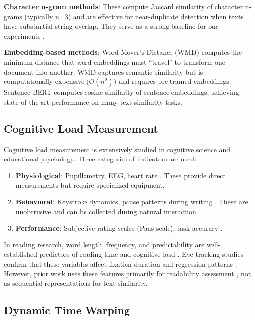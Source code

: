 \documentclass[11pt,letterpaper]{article}
\begin{document}
\textbf{Character n-gram methods}: These compute Jaccard similarity of character n-grams (typically n=3) and are effective for near-duplicate detection when texts have substantial string overlap. They serve as a strong baseline for our experiments \cite{Ukkonen1992}.

\textbf{Embedding-based methods}: Word Mover's Distance (WMD) \cite{Kusner2015} computes the minimum distance that word embeddings must ``travel'' to transform one document into another. WMD captures semantic similarity but is computationally expensive ($O(n^2)$) and requires pre-trained embeddings. Sentence-BERT \cite{Reimers2019} computes cosine similarity of sentence embeddings, achieving state-of-the-art performance on many text similarity tasks.

\subsection{Cognitive Load Measurement}

Cognitive load measurement is extensively studied in cognitive science and educational psychology. Three categories of indicators are used:

\begin{enumerate}
\item \textbf{Physiological}: Pupillometry, EEG, heart rate \cite{Wei2025}. These provide direct measurements but require specialized equipment.

\item \textbf{Behavioral}: Keystroke dynamics, pause patterns during writing \cite{Zhang2021}. These are unobtrusive and can be collected during natural interaction.

\item \textbf{Performance}: Subjective rating scales (Paas scale), task accuracy \cite{Ouwehand2021}.
\end{enumerate}

In reading research, word length, frequency, and predictability are well-established predictors of reading time and cognitive load \cite{Kuperman2013}. Eye-tracking studies confirm that these variables affect fixation duration and regression patterns \cite{Demberg2008}. However, prior work uses these features primarily for readability assessment \cite{Vajjala2012}, not as sequential representations for text similarity.

\subsection{Dynamic Time Warping}
\end{document}
